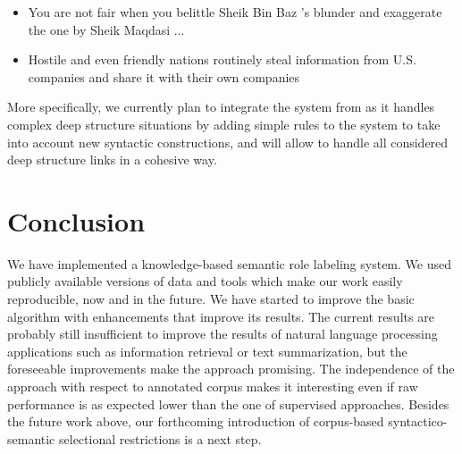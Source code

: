 \begin{itemize}
    \item You are not fair when you belittle Sheik Bin Baz 's blunder and
          exaggerate the one by Sheik Maqdasi ...
    \item Hostile and even friendly nations routinely steal information from
          U.S. companies and share it with their own companies
\end{itemize}

More specifically, we currently plan to integrate the system from
\citep{ribeyre2013systeme} as it handles complex deep structure situations
by adding simple rules to the system to take into account new syntactic
constructions, and will allow to handle all considered deep structure links in
a cohesive way.

\section{Conclusion}

We have implemented a knowledge-based semantic role labeling system. We used
publicly available versions of data and tools which make our work easily
reproducible, now and in the future. We have started to improve the basic
algorithm with enhancements that improve its results. The current results are
probably still insufficient to improve the results of natural language
processing applications such as information retrieval or text summarization,
but the foreseeable improvements make the approach promising. The independence
of the approach with respect to annotated corpus makes it interesting even if
raw performance is as expected lower than the one of supervised approaches.
Besides the future work above, our forthcoming introduction of corpus-based
syntactico-semantic selectional restrictions is a next step.
